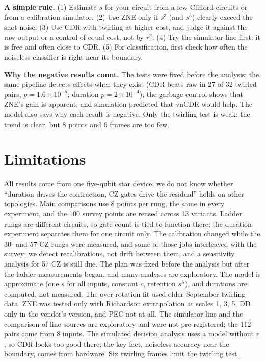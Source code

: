 \documentclass[aps,pra,twocolumn,superscriptaddress,nofootinbib,10pt]{revtex4-2}
\begin{document}
\textbf{A simple rule.} (1) Estimate $s$ for your circuit from a few Clifford circuits or from a
calibration simulator. (2) Use ZNE only if $s^3$ (and $s^5$) clearly exceed the shot noise.
(3) Use CDR with twirling at higher cost, and judge it against the raw output or a control of equal
cost, not by $r^2$. (4) Try the simulator line first: it is free and often close to CDR.
(5) For classification, first check how often the noiseless classifier is right near its boundary.

\textbf{Why the negative results count.} The tests were fixed before the analysis; the same
pipeline detects effects when they exist (CDR beats raw in 27 of 32 twirled pairs,
$p=1.6\times10^{-5}$; duration $p=2\times10^{-4}$); the garbage control shows that ZNE's gain is
apparent; and simulation predicted that vnCDR would help. The model also says why each result is
negative. Only the twirling test is weak: the trend is clear, but 8 points and 6 frames are too few.

\section{Limitations}

All results come from one five-qubit star device; we do not know whether ``duration drives the
contraction, CZ gates drive the residual'' holds on other topologies. Main comparisons use 8 points
per rung, the same in every experiment, and the 100 survey points are reused across 13 variants.
Ladder rungs are different circuits, so gate count is tied to function there; the duration
experiment separates them for one circuit only. The calibration changed while the 30- and 57-CZ
rungs were measured, and some of those jobs interleaved with the survey; we detect recalibrations,
not drift between them, and a sensitivity analysis for 57 CZ is still due. The plan was fixed before
the analysis but after the ladder measurements began, and many analyses are exploratory. The model
is approximate (one $s$ for all inputs, constant $c$, retention $s^\lambda$), and durations are
computed, not measured. The over-rotation fit used older September twirling data. ZNE was tested
only with Richardson extrapolation at scales 1, 3, 5, DD only in the vendor's version, and PEC not
at all. The simulator line and the comparison of line sources are exploratory and were not
pre-registered; the 112 pairs come from 8 inputs. The simulated decision analysis uses a model without $r$,
so CDR looks too good there; the key fact, noiseless accuracy near the boundary, comes from
hardware. Six twirling frames limit the twirling test.
\end{document}
